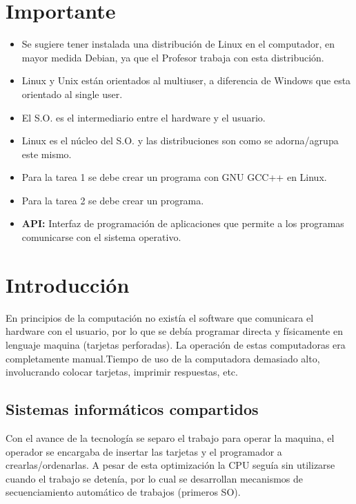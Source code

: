 \documentclass{templateNote}
\begin{document}


\portada
\margenes 
\tableofcontents
\newpage


\section{Importante}

\begin{itemize}
    \item Se sugiere tener instalada una distribución de Linux en el computador, en mayor medida Debian, ya que el Profesor trabaja con esta distribución.
    \item Linux y Unix están orientados al multiuser, a diferencia de Windows que esta orientado al single user.
    \item El S.O. es el intermediario entre el hardware y el usuario.
    \item Linux es el núcleo del S.O. y las distribuciones son como se adorna/agrupa este mismo.
    \item Para la tarea 1 se debe crear un programa con GNU GCC++ en Linux.
    \item Para la tarea 2 se debe crear un programa.
    \item \textbf{API:} Interfaz de programación de aplicaciones que permite a los programas comunicarse con el sistema operativo.
\end{itemize}

\newpage
\section{Introducción}
En principios de la computación no existía el software que comunicara el hardware con el usuario, por lo que se debía programar directa y físicamente en lenguaje maquina (tarjetas perforadas). La operación de estas computadoras era completamente manual.Tiempo de uso de la computadora demasiado alto, involucrando colocar tarjetas, imprimir respuestas, etc.

\subsection*{Sistemas informáticos compartidos}

Con el avance de la tecnología se separo el trabajo para operar la maquina, el operador se encargaba de insertar las tarjetas y el programador a crearlas/ordenarlas. A pesar de esta optimización la CPU seguía sin utilizarse cuando el trabajo se detenía, por lo cual se desarrollan mecanismos de secuenciamiento automático de trabajos (primeros SO).
\end{document}
